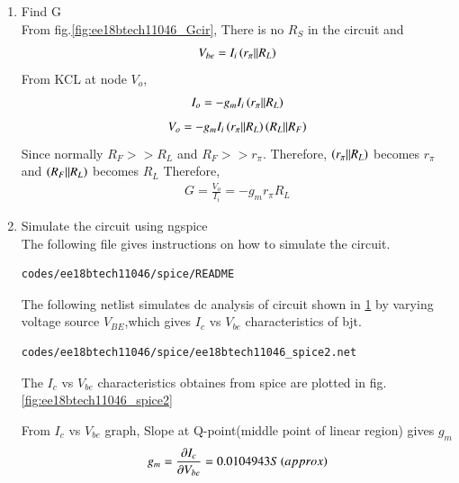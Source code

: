 \begin{enumerate}[label=\arabic*.,ref=\theenumi]
\item Find G
\\
\solution
From fig.\ref{fig:ee18btech11046_Gcir},
There is no $R_{S}$ in the circuit and
\begin{align}
V_{be} = I_{i}\left(r_{\pi}||R_{L}\right)
\end{align}
From KCL at node $V_{o}$,
\begin{align}
I_{o} = -g_{m}I_{i}\left(r_{\pi}||R_{L}\right)
\end{align}
\begin{align}
V_{o} = -g_{m}I_{i}\left(r_{\pi}||R_{L}\right)\left(R_{L}||R_{F}\right)
\end{align}
Since normally $R_{F}>>R_{L}$ and $R_{F}>>r_{\pi}$. Therefore, $\left(r_{\pi}||R_{L}\right)$ becomes $r_{\pi}$ and $\left(R_{F}||R_{L}\right)$ becomes $R_{L}$
Therefore,
\begin{align}
G =\frac{V_{o}}{I_{i}} = -g_{m}r_{\pi}R_{L}
\end{align}

\item Simulate the circuit using ngspice
\\
\solution
The following file gives instructions on how to simulate the circuit.
\begin{lstlisting}
codes/ee18btech11046/spice/README
\end{lstlisting}

%
\begin{figure}[ht!]
	\begin{center}
		\resizebox{\columnwidth}{!}{}
	\end{center}
	\caption{}
	\label{fig:ee18btech11046_spiceCircuit}
\end{figure}
%

The following netlist simulates dc analysis of circuit shown in \ref{fig:ee18btech11046_spiceCircuit} by varying voltage source $V_{BE}$,which gives $I_{c}$ vs $V_{be}$ characteristics of bjt.
\begin{lstlisting}
codes/ee18btech11046/spice/ee18btech11046_spice2.net
\end{lstlisting}

The $I_{c}$ vs $V_{be}$ characteristics obtaines from spice are plotted in fig.\ref{fig:ee18btech11046_spice2}

From $I_{c}$ vs $V_{be}$ graph, Slope at Q-point(middle point of linear region) gives $g_{m}$
\begin{align}
g_{m} = \frac{\partial I_{c}}{\partial V_{be}} = 0.0104943S\left(approx\right)
\end{align}



\end{enumerate}
